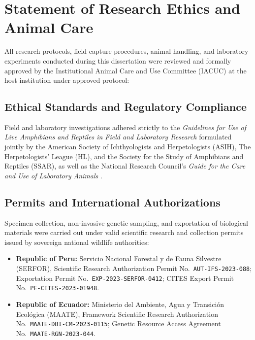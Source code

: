
\chapter*{Statement of Research Ethics and Animal Care}

All research protocols, field capture procedures, animal handling, and laboratory experiments conducted during this dissertation were reviewed and formally approved by the Institutional Animal Care and Use Committee (IACUC) at the host institution under approved protocol:

\begin{center}
\end{center}

\section*{Ethical Standards and Regulatory Compliance}
Field and laboratory investigations adhered strictly to the \textit{Guidelines for Use of Live Amphibians and Reptiles in Field and Laboratory Research} formulated jointly by the American Society of Ichthyologists and Herpetologists (ASIH), The Herpetologists' League (HL), and the Society for the Study of Amphibians and Reptiles (SSAR), as well as the National Research Council's \textit{Guide for the Care and Use of Laboratory Animals} \parencite{nrc2011animalguide}.

\section*{Permits and International Authorizations}
Specimen collection, non-invasive genetic sampling, and exportation of biological materials were carried out under valid scientific research and collection permits issued by sovereign national wildlife authorities:
\begin{itemize}
  \item \textbf{Republic of Peru:} Servicio Nacional Forestal y de Fauna Silvestre (SERFOR), Scientific Research Authorization Permit No.~\texttt{AUT-IFS-2023-088}; Exportation Permit No.~\texttt{EXP-2023-SERFOR-0412}; CITES Export Permit No.~\texttt{PE-CITES-2023-01948}.
  \item \textbf{Republic of Ecuador:} Ministerio del Ambiente, Agua y Transici{\'o}n Ecol{\'o}gica (MAATE), Framework Scientific Research Authorization No.~\texttt{MAATE-DBI-CM-2023-0115}; Genetic Resource Access Agreement No.~\texttt{MAATE-RGN-2023-044}.
\end{itemize}

